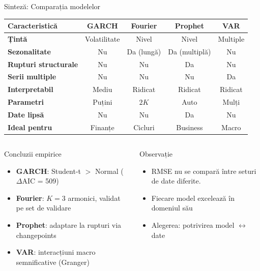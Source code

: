 \documentclass[9pt, aspectratio=169, t]{beamer}
\begin{document}
\begin{frame}{Sinteză: Comparația modelelor}
    \vspace{-0.2cm}
    \begin{center}
    \footnotesize
    \begin{tabular}{lcccc}
        \toprule
        \textbf{Caracteristică} & \textbf{GARCH} & \textbf{Fourier} & \textbf{Prophet} & \textbf{VAR} \\
        \midrule
        \textbf{Țintă} & Volatilitate & Nivel & Nivel & Multiple \\
        \textbf{Sezonalitate} & Nu & Da (lungă) & Da (multiplă) & Nu \\
        \textbf{Rupturi structurale} & Nu & Nu & Da & Nu \\
        \textbf{Serii multiple} & Nu & Nu & Nu & Da \\
        \textbf{Interpretabil} & Mediu & Ridicat & Ridicat & Ridicat \\
        \textbf{Parametri} & Puțini & $2K$ & Auto & Mulți \\
        \textbf{Date lipsă} & Nu & Nu & Da & Nu \\
        \midrule
        \textbf{Ideal pentru} & Finanțe & Cicluri & Business & Macro \\
        \bottomrule
    \end{tabular}
    \end{center}

    \vspace{0.1cm}

    \begin{columns}[T]
        \begin{block}{Concluzii empirice}
            \begin{itemize}\setlength{\itemsep}{0pt}
                \item \textbf{GARCH}: Student-t $>$ Normal ($\Delta$AIC = 509)
                \item \textbf{Fourier}: $K=3$ armonici, validat pe set de validare
                \item \textbf{Prophet}: adaptare la rupturi via changepoints
                \item \textbf{VAR}: interacțiuni macro semnificative (Granger)
            \end{itemize}
        \end{block}

        \begin{exampleblock}{Observație}
            \begin{itemize}\setlength{\itemsep}{0pt}
                \item RMSE nu se compară între seturi de date diferite.
                \item Fiecare model excelează în domeniul său
                \item Alegerea: potrivirea model $\leftrightarrow$ date
            \end{itemize}
        \end{exampleblock}
    \end{columns}
\end{frame}
\end{document}
